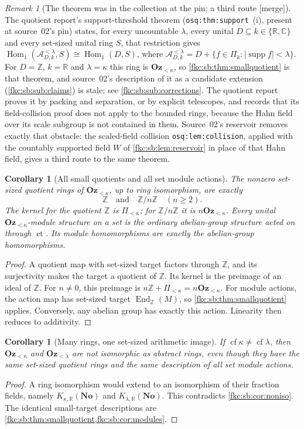\documentclass[11pt,letterpaper]{article}
\numberwithin{equation}{section}
\newtheorem{corollary}[theorem]{Corollary}
\theoremstyle{definition}
\theoremstyle{remark}
\newtheorem{remark}[theorem]{Remark}
\newcommand{\R}{\mathbb R}
\newcommand{\C}{\mathbb C}
\newcommand{\No}{\mathbf{No}}
\newcommand{\supp}{\operatorname{supp}}
\newcommand{\cf}{\operatorname{cf}}
\newcommand{\mergetag}{\textup{\textsf{\small[merge]}}}%
\newcommand{\Z}{\mathbb Z}
\newcommand{\Oz}{\mathbf{Oz}}
\newcommand{\ct}{\operatorname{ct}}
\newcommand{\card}[1]{\lvert #1\rvert}
\newcommand{\KN}[2]{K_{#1,#2}(\No)}%
\newcommand{\Ok}{\Oz_{<\kappa}}
\newcommand{\Okl}[1]{\Oz_{<#1}}
\newcommand{\Pk}{\Pi_{<\kappa}}
\newcommand{\lbl}[1]{\nolinkurl{#1}}%
\begin{document}
\begin{remark}[The theorem was in the collection at the pin; a third route \mergetag]\label{fkc:sb:rem:osq}
The quotient report's support-threshold theorem (\lbl{osq:thm:support}~(i), present at source~02's pin) states, for every uncountable $\lambda$, every unital $D\subseteq k\in\{\R,\C\}$ and every set-sized unital ring $S$, that restriction gives $\operatorname{Hom}_1(\mathcal A^{<\lambda}_{D,k},S)\cong\operatorname{Hom}_1(D,S)$, where $\mathcal A^{<\lambda}_{D,k}=D+\{f\in\Pi_k:\card{\supp f}<\lambda\}$. For $D=\Z$, $k=\R$ and $\lambda=\kappa$ this ring is $\Ok$, so \cref{fkc:sb:thm:smallquotient} is that theorem, and source~02's description of it as a candidate extension (\cref{fkc:sb:sub:claims}) is stale; see \cref{fkc:sb:sub:corrections}. The quotient report proves it by packing and separation, or by explicit telescopes, and records that its field-collision proof does not apply to the bounded rings, because the Hahn field over its scale subgroup is not contained in them. Source~02's reservoir removes exactly that obstacle: the scaled-field collision \lbl{osq:lem:collision}, applied with the countably supported field $W$ of \cref{fkc:sb:lem:reservoir} in place of that Hahn field, gives a third route to the same theorem.
\end{remark}

\begin{corollary}[All small quotients and all set module actions]\label{fkc:sb:cor:modules}
The nonzero set-sized quotient rings of $\Ok$, up to ring isomorphism, are exactly
\[
 \Z\quad\text{and}\quad\Z/n\Z\quad(n\ge2).
\]
The kernel for the quotient $\Z$ is $\Pk$; for $\Z/n\Z$ it is $n\Ok$. Every unital $\Ok$-module structure on a set is the ordinary abelian-group structure acted on through $\ct$. Its module homomorphisms are exactly the abelian-group homomorphisms.
\end{corollary}
\begin{proof}
A quotient map with set-sized target factors through $\Z$, and its surjectivity makes the target a quotient of $\Z$. Its kernel is the preimage of an ideal of $\Z$. For $n\ne0$, this preimage is $n\Z+\Pk=n\Ok$. For module actions, the action map has set-sized target $\operatorname{End}_{\Z}(M)$, so \cref{fkc:sb:thm:smallquotient} applies. Conversely, any abelian group has exactly this action. Linearity then reduces to additivity.
\end{proof}

\begin{corollary}[Many rings, one set-sized arithmetic image]\label{fkc:sb:cor:rings}
If $\cf\kappa\ne\cf\lambda$, then $\Ok$ and $\Okl\lambda$ are not isomorphic as abstract rings, even though they have the same set-sized quotient rings and the same description of all set module actions.
\end{corollary}
\begin{proof}
A ring isomorphism would extend to an isomorphism of their fraction fields, namely $\KN\kappa\R$ and $\KN\lambda\R$. This contradicts \cref{fkc:sb:cor:noniso}. The identical small-target descriptions are \cref{fkc:sb:thm:smallquotient,fkc:sb:cor:modules}.
\end{proof}
\end{document}
